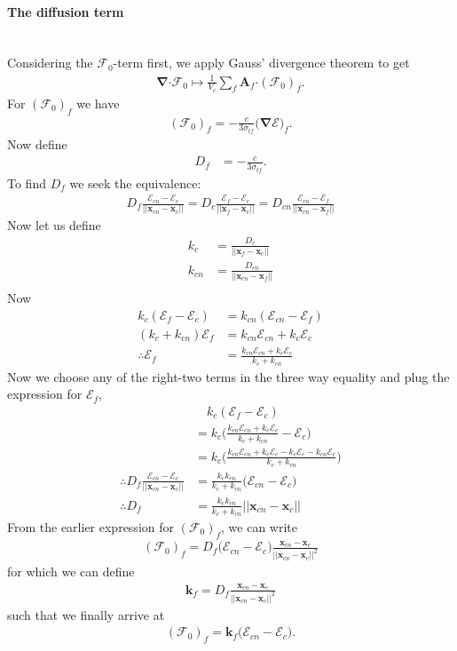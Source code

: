 \documentclass[10pt,letterpaper,notitlepage]{article}
\numberwithin{equation}{section}
\newcommand{\bnabla}{\boldsymbol{\nabla}}
\newcommand{\position}{\mathbf{x}}
\newcommand{\dotp}{\boldsymbol{\cdot}}
\newcommand{\RadE}{\mathcal{E}}
\newcommand{\RadF}{\boldsymbol{\mathcal{F}}}
\newcommand{\RadJ}{\RadF_0}
\newcommand{\AreaVec}{\mathbf{A}}
\newcommand{\beqn}{\begin{equation}\begin{aligned}}
\newcommand{\eeqn}{\end{aligned}\end{equation}}
\begin{document}
\paragraph{The diffusion term} \mbox{}\\
Considering the $\RadJ$-term first, we apply Gauss' divergence theorem to get
\beqn 
\bnabla \dotp \RadJ \mapsto \frac{1}{V_c} \sum_f \AreaVec_f \dotp (\RadJ)_f.
\eeqn 
For $(\RadJ)_f$ we have
\beqn 
(\RadJ)_f = - \frac{c}{3\sigma_{tf}} \bigr(\bnabla \RadE \bigr)_f.
\eeqn 
Now define
\beqn
D_f &= - \frac{c}{3\sigma_{tf}}.
\eeqn 
To find $D_f$ we seek the equivalence:
\beqn
D_f \frac{\RadE_{cn} - \RadE_c}{|| \position_{cn} - \position_{c} ||} 
=
D_c \frac{\RadE_{f} - \RadE_c}{|| \position_{f} - \position_{c} ||} 
=
D_{cn} \frac{\RadE_{cn} - \RadE_f}{|| \position_{cn} - \position_{f} ||} 
\eeqn
Now let us define
\beqn 
k_c &= \frac{D_c}{|| \position_{f} - \position_{c} ||} \\
k_{cn} &= \frac{D_{cn}}{|| \position_{cn} - \position_{f} ||} \\
\eeqn 
Now
\beqn
k_c (\RadE_f - \RadE_c) &= k_{cn} (\RadE_{cn} - \RadE_f) \\
 (k_c +k_{cn}) \RadE_f &= k_{cn} \RadE_{cn} + k_c \RadE_{c} \\
 \therefore
 \RadE_f &= \frac{k_{cn} \RadE_{cn} + k_c \RadE_{c}}{k_c + k_{cn}}
\eeqn
Now we choose any of the right-two terms in the three way equality and plug the expression for $\RadE_f$,
\beqn 
&\quad k_c (\RadE_f - \RadE_c) \\
&= k_c \biggr(
\frac{k_{cn} \RadE_{cn} + k_c \RadE_{c}}{k_c + k_{cn}} - \RadE_c
\biggr) \\
&= k_c \biggr(
\frac{k_{cn} \RadE_{cn} + k_c \RadE_{c} - k_c\RadE_c -k_{cn} \RadE_c}{k_c + k_{cn}}
\biggr) \\
\therefore 
D_f \frac{\RadE_{cn} - \RadE_c}{|| \position_{cn} - \position_{c} ||} 
&= \frac{k_c k_{cn}}{k_c + k_{cn}} \bigr(\RadE_{cn} - \RadE_c \bigr)\\
\therefore
D_f &= \frac{k_c k_{cn}}{k_c + k_{cn}}  || \position_{cn} - \position_{c} ||
\eeqn 
From the earlier expression for $(\RadF_0)_f$, we can write
\beqn 
(\RadJ)_f = D_f \bigr( \RadE_{cn} - \RadE_c \bigr) \frac{\position_{cn} - \position_{c}}{|| \position_{cn} - \position_{c}||^2}
\eeqn 
for which we can define
\beqn 
\mathbf{k}_f = D_f  \frac{\position_{cn} - \position_{c}}{|| \position_{cn} - \position_{c}||^2}
\eeqn 
such that we finally arrive at
\beqn 
(\RadJ)_f = \mathbf{k}_f \bigr( \RadE_{cn} - \RadE_c \bigr).
\eeqn 
\end{document}
